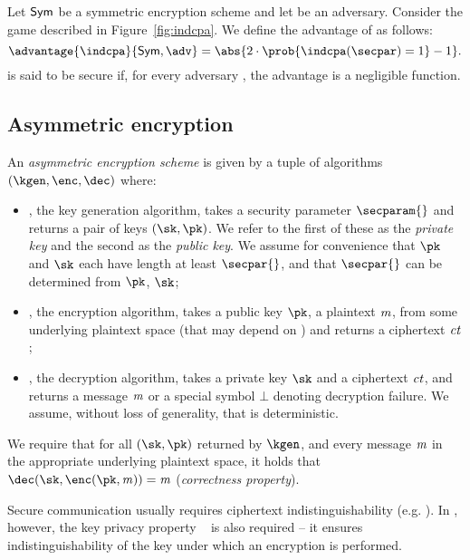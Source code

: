 \begin{definition}[\indcpa]
    Let $\mathsf{Sym}$ be a symmetric encryption scheme and let \adv{} be an adversary. Consider the \indcpa{} game described in Figure~\ref{fig:indcpa}.
    We define the \indcpa{} advantage of \adv{} as follows:
    \[
        \advantage{\indcpa}{\sym, \adv} =  \abs{2\cdot\prob{\indcpa(\secpar) = 1} - 1}.
    \]
    \sym{} is said to be \indcpa{} secure if, for every \ppt{} adversary \adv{}, the advantage \advantage{\indcpa}{\sym, \adv} is a negligible function.
\end{definition}

\subsection{Asymmetric encryption}\label{preliminaries:definitions:asym-enc}

\begin{definition}
    An \emph{asymmetric encryption scheme} \aSym{} is given by a tuple of \ppt{} algorithms $(\kgen,\enc,\dec)$ where:
    \begin{itemize}
        \item \kgen{}, the key generation algorithm, takes a security parameter $\secparam{}$ and returns a pair of keys $(\sk,\pk)$. We refer to the first of these as the \emph{private key} and the second as the \emph{public key}. We assume for convenience that $\pk$ and $\sk$ each have length at least $\secpar{}$, and that $\secpar{}$ can be determined from $\pk$, $\sk$;
        \item \enc{}, the encryption algorithm, takes a public key $\pk$, a plaintext $\mathit{m}$, from some underlying plaintext space (that may depend on \pk) and returns a ciphertext $\mathit{ct}$;
        \item \dec{}, the decryption algorithm, takes a private key $\sk$ and a ciphertext $\mathit{ct}$, and returns a message $\mathit{m}$ or a special symbol $\bot$ denoting decryption failure. We assume, without loss of generality, that \dec{} is deterministic.
    \end{itemize}
    We require that for all $(\sk,\pk)$ returned by $\kgen$, and every message $\mathit{m}$ in the appropriate underlying plaintext space, it holds that $\dec(\sk, \enc(\pk,\msg)) = \msg$ (\emph{correctness property}).
\end{definition}

Secure communication usually requires ciphertext indistinguishability  (e.g. \indccaii{} \cite[Definition 8]{abdalla1999dhaes}). In \zeth, however, the key privacy property \ikcca{}~\cite{bellare2001key} is also required -- it ensures indistinguishability of the key under which an encryption is performed.

